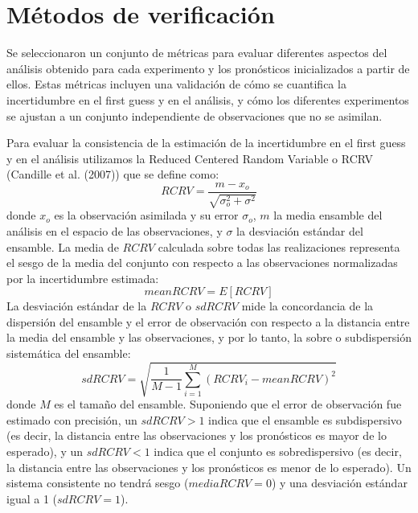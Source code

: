 \documentclass[12pt,oneside,a4paper]{reedthesis}
\begin{document}
\hypertarget{muxe9todos-de-verificaciuxf3n}{%
\section{Métodos de verificación}\label{muxe9todos-de-verificaciuxf3n}}

Se seleccionaron un conjunto de métricas para evaluar diferentes aspectos del análisis obtenido para cada experimento y los pronósticos inicializados a partir de ellos. Estas métricas incluyen una validación de cómo se cuantifica la incertidumbre en el first guess y en el análisis, y cómo los diferentes experimentos se ajustan a un conjunto independiente de observaciones que no se asimilan.

Para evaluar la consistencia de la estimación de la incertidumbre en el first guess y en el análisis utilizamos la Reduced Centered Random Variable o RCRV (Candille et al. (2007)) que se define como:
\begin{equation}
\mathit{RCRV} = \frac{m - x_o}{\sqrt{\sigma_o^2 + \sigma^2}}
\label{eq:eq6}
\end{equation}
donde \(x_o\) es la observación asimilada y su error \(\sigma_o\), \(m\) la media ensamble del análisis en el espacio de las observaciones, y \(\sigma\) la desviación estándar del ensamble.
La media de \(RCRV\) calculada sobre todas las realizaciones representa el sesgo de la media del conjunto con respecto a las observaciones normalizadas por la incertidumbre estimada:
\begin{equation}
\mathit{mean RCRV} = E[RCRV]
\label{eq:eq7}
\end{equation}
La desviación estándar de la \(RCRV\) o \(sd RCRV\) mide la concordancia de la dispersión del ensamble y el error de observación con respecto a la distancia entre la media del ensamble y las observaciones, y por lo tanto, la sobre o subdispersión sistemática del ensamble:
\begin{equation}
\mathit{sd RCRV} = \sqrt{\frac{1}{M -1}\sum_{i=1}^{M}(RCRV_i - \mathit{mean RCRV})^2}
\label{eq:eq8}
\end{equation}
donde \(M\) es el tamaño del ensamble. Suponiendo que el error de observación fue estimado con precisión, un \(sd RCRV > 1\) indica que el ensamble es subdispersivo (es decir, la distancia entre las observaciones y los pronósticos es mayor de lo esperado), y un \(sd RCRV < 1\) indica que el conjunto es sobredispersivo (es decir, la distancia entre las observaciones y los pronósticos es menor de lo esperado). Un sistema consistente no tendrá sesgo (\(media RCRV = 0\)) y una desviación estándar igual a 1 (\(sd RCRV = 1\)).
\end{document}
